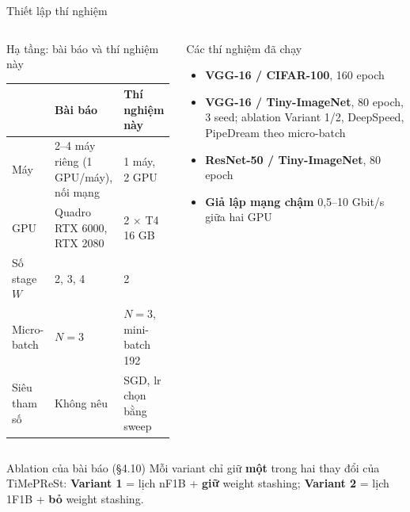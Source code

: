 \documentclass[10pt,aspectratio=169]{beamer}
\newcommand{\kw}[1]{\textcolor{uitblue}{\bfseries #1}}
\begin{document}
\begin{frame}{Thiết lập thí nghiệm}
\begin{columns}[T]
\begin{uitbox}{\faServer\; Hạ tầng: bài báo và thí nghiệm này}
\scriptsize
\setlength{\tabcolsep}{3pt}
\renewcommand{\arraystretch}{1.1}
\begin{tabular}{@{}L{1.6cm}L{3.0cm}L{2.3cm}@{}}
\toprule
 & \textbf{Bài báo} & \textbf{Thí nghiệm này} \\
\midrule
Máy & 2--4 máy riêng (1 GPU/máy), nối mạng & 1 máy, 2 GPU \\
GPU & Quadro RTX 6000, RTX 2080 & 2 $\times$ T4 16 GB \\
Số stage $W$ & 2, 3, 4 & 2 \\
Micro-batch & $N = 3$ & $N = 3$, mini-batch 192 \\
Siêu tham số & Không nêu & SGD, lr chọn bằng sweep \\
\bottomrule
\end{tabular}
\end{uitbox}

\begin{greenbox}{\faFlask\; Các thí nghiệm đã chạy}
\scriptsize
\begin{itemize}
  \item \kw{VGG-16 / CIFAR-100}, 160 epoch
  \item \kw{VGG-16 / Tiny-ImageNet}, 80 epoch, 3 seed; ablation Variant 1/2, DeepSpeed, PipeDream theo micro-batch
  \item \kw{ResNet-50 / Tiny-ImageNet}, 80 epoch
  \item \kw{Giả lập mạng chậm} 0,5--10 Gbit/s giữa hai GPU
\end{itemize}
\end{greenbox}
\end{columns}
\vspace{0.1cm}
\begin{accentbox}{\faProjectDiagram\; Ablation của bài báo (\S4.10)}
\scriptsize
Mỗi variant chỉ giữ \textbf{một} trong hai thay đổi của TiMePReSt: \kw{Variant 1} = lịch nF1B + \textbf{giữ} weight stashing; \kw{Variant 2} = lịch 1F1B + \textbf{bỏ} weight stashing.
\end{accentbox}
\end{frame}
\end{document}
